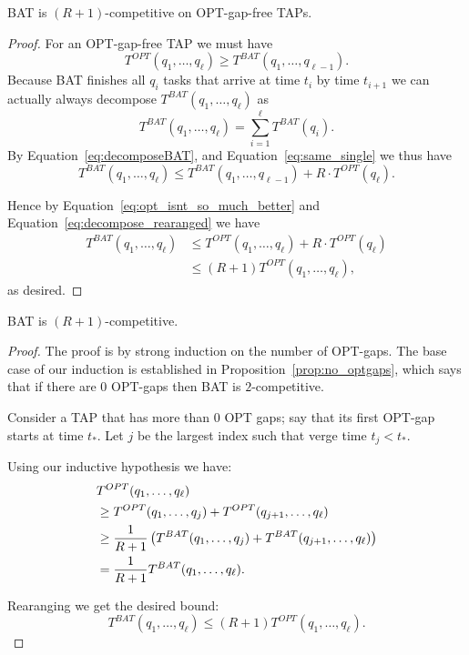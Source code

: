 \begin{proposition}
  \label{prop:no_optgaps}
  BAT is $(R+1)$-competitive on OPT-gap-free TAPs.
\end{proposition}
\begin{proof}
  For an OPT-gap-free TAP we must have
  \begin{equation}
    \label{eq:opt_isnt_so_much_better}
    T^{OPT}(q_1, \ldots, q_{\ell}) \ge T^{BAT}(q_1, \ldots, q_{\ell-1}).
  \end{equation}
  Because BAT finishes all $q_{i}$ tasks that arrive at time $t_i$
  by time $t_{i+1}$ we can actually always decompose
  $T^{BAT}(q_1, \ldots, q_\ell)$ as 
  \begin{equation}
    \label{eq:decomposeBAT}
    T^{BAT}(q_1, \ldots, q_\ell) = \sum_{i=1}^\ell T^{BAT}(q_i).
  \end{equation}
  By Equation~\eqref{eq:decomposeBAT}, and
  Equation~\eqref{eq:same_single} we thus have 
  \begin{equation}
    \label{eq:decompose_rearanged}
    T^{BAT}(q_1, \ldots, q_\ell) \le T^{BAT}(q_1, \ldots, q_{\ell-1}) + R \cdot T^{OPT}(q_\ell).
  \end{equation}

  Hence by Equation~\eqref{eq:opt_isnt_so_much_better} and
  Equation~\eqref{eq:decompose_rearanged} we have
  \begin{align*}
    T^{BAT}(q_1, \ldots, q_\ell) &\le T^{OPT}(q_1, \ldots, q_\ell) + R\cdot T^{OPT}(q_\ell)\\
                                 &\le (R+1)T^{OPT}(q_1, \ldots, q_\ell),
  \end{align*}
  as desired.
\end{proof}

\begin{theorem}
  \label{thm:constant_competitive}
  BAT is $(R+1)$-competitive.
\end{theorem}
\begin{proof}
  The proof is by strong induction on the number of OPT-gaps. 
  The base case of our induction is established in
  Proposition~\ref{prop:no_optgaps}, which says that if there are $0$
  OPT-gaps then BAT is $2$-competitive. 

  Consider a TAP that has more than $0$ OPT gaps;
  say that its first OPT-gap starts at time $t_*$.
  Let $j$ be the largest index such that verge time $t_j < t_*$.

  Using our inductive hypothesis we have:
  \begin{align*}
  &T^{OPT}(q_1, \ldots, q_\ell) \\
  &\ge T^{OPT}(q_1, \ldots, q_j) + T^{OPT}(q_{j+1}, \ldots, q_{\ell})\\
  &\ge \frac{1}{R+1}\left( T^{BAT}(q_1, \ldots, q_j) + T^{BAT}(q_{j+1}, \ldots, q_{\ell}) \right)\\
  &=\frac{1}{R+1} T^{BAT}(q_1, \ldots, q_\ell).
  \end{align*}

  Rearanging we get the desired bound:
  $$T^{BAT}(q_1, \ldots, q_\ell) \le (R+1) T^{OPT}(q_1, \ldots, q_\ell).$$
\end{proof}

